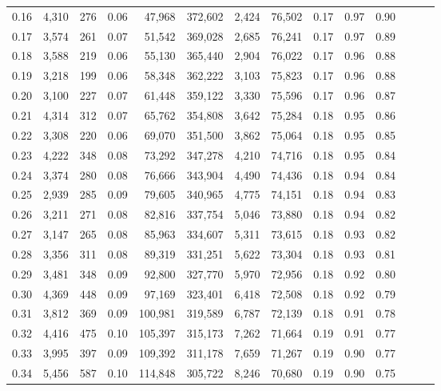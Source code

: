 \begin{tabular}{rrrrrrrrrrrrrr}
0.16 &  4,310 &    276 &  0.06 &   47,968 &  372,602 &   2,424 &  76,502 &  0.17 &  0.97 &      0.90 \\
0.17 &  3,574 &    261 &  0.07 &   51,542 &  369,028 &   2,685 &  76,241 &  0.17 &  0.97 &      0.89 \\
0.18 &  3,588 &    219 &  0.06 &   55,130 &  365,440 &   2,904 &  76,022 &  0.17 &  0.96 &      0.88 \\
0.19 &  3,218 &    199 &  0.06 &   58,348 &  362,222 &   3,103 &  75,823 &  0.17 &  0.96 &      0.88 \\
0.20 &  3,100 &    227 &  0.07 &   61,448 &  359,122 &   3,330 &  75,596 &  0.17 &  0.96 &      0.87 \\
0.21 &  4,314 &    312 &  0.07 &   65,762 &  354,808 &   3,642 &  75,284 &  0.18 &  0.95 &      0.86 \\
0.22 &  3,308 &    220 &  0.06 &   69,070 &  351,500 &   3,862 &  75,064 &  0.18 &  0.95 &      0.85 \\
0.23 &  4,222 &    348 &  0.08 &   73,292 &  347,278 &   4,210 &  74,716 &  0.18 &  0.95 &      0.84 \\
0.24 &  3,374 &    280 &  0.08 &   76,666 &  343,904 &   4,490 &  74,436 &  0.18 &  0.94 &      0.84 \\
0.25 &  2,939 &    285 &  0.09 &   79,605 &  340,965 &   4,775 &  74,151 &  0.18 &  0.94 &      0.83 \\
0.26 &  3,211 &    271 &  0.08 &   82,816 &  337,754 &   5,046 &  73,880 &  0.18 &  0.94 &      0.82 \\
0.27 &  3,147 &    265 &  0.08 &   85,963 &  334,607 &   5,311 &  73,615 &  0.18 &  0.93 &      0.82 \\
0.28 &  3,356 &    311 &  0.08 &   89,319 &  331,251 &   5,622 &  73,304 &  0.18 &  0.93 &      0.81 \\
0.29 &  3,481 &    348 &  0.09 &   92,800 &  327,770 &   5,970 &  72,956 &  0.18 &  0.92 &      0.80 \\
0.30 &  4,369 &    448 &  0.09 &   97,169 &  323,401 &   6,418 &  72,508 &  0.18 &  0.92 &      0.79 \\
0.31 &  3,812 &    369 &  0.09 &  100,981 &  319,589 &   6,787 &  72,139 &  0.18 &  0.91 &      0.78 \\
0.32 &  4,416 &    475 &  0.10 &  105,397 &  315,173 &   7,262 &  71,664 &  0.19 &  0.91 &      0.77 \\
0.33 &  3,995 &    397 &  0.09 &  109,392 &  311,178 &   7,659 &  71,267 &  0.19 &  0.90 &      0.77 \\
0.34 &  5,456 &    587 &  0.10 &  114,848 &  305,722 &   8,246 &  70,680 &  0.19 &  0.90 &      0.75 \\

\end{tabular}
